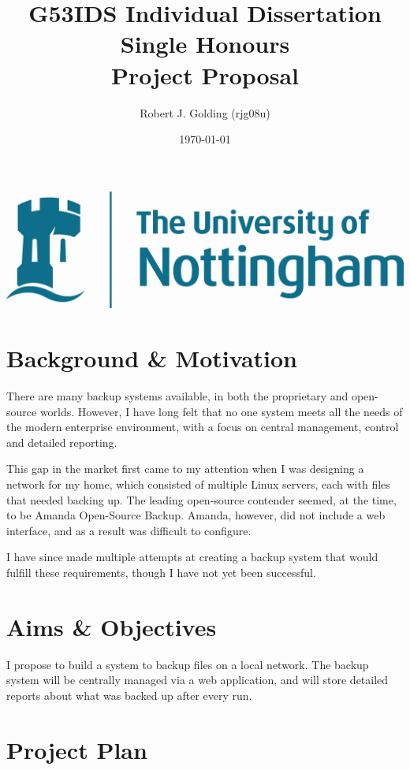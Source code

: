 \documentclass[a4paper]{article}
\title{
    \vspace{3cm}
    \huge{G53IDS Individual Dissertation Single Honours} \\[0.5cm]
    \LARGE{Project Proposal} \\[0.2cm]
}
\author{Robert J. Golding (rjg08u)} \date{\today}
\begin{document}
    \maketitle
    \vspace{10cm}
    \begin{center}
        \includegraphics{notts.jpg}
    \end{center}
    \newpage

    \section{Background \& Motivation}
    There are many backup systems available, in both the proprietary and
    open-source worlds. However, I have long felt that no one system meets all
    the needs of the modern enterprise environment, with a focus on central
    management, control and detailed reporting.

    This gap in the market first came to my attention when I was designing
    a network for my home, which consisted of multiple Linux servers, each with
    files that needed backing up. The leading open-source contender seemed, at
    the time, to be Amanda Open-Source Backup. Amanda, however, did not include
    a web interface, and as a result was difficult to configure.

    I have since made multiple attempts at creating a backup system that would
    fulfill these requirements, though I have not yet been successful.

    \section{Aims \& Objectives}
    I propose to build a system to backup files on a local network. The backup
    system will be centrally managed via a web application, and will store
    detailed reports about what was backed up after every run.

    \section{Project Plan}
\end{document}
